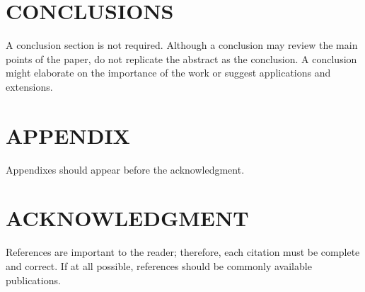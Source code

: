 \documentclass[a4paper, 10pt, conference]{ieeeconf}      %
\begin{document}
\section{CONCLUSIONS}

A conclusion section is not required. Although a conclusion may review the main points of the paper, do not replicate the abstract as the conclusion. A conclusion might elaborate on the importance of the work or suggest applications and extensions. 

\addtolength{\textheight}{-12cm}   %







\section*{APPENDIX}

Appendixes should appear before the acknowledgment.

\section*{ACKNOWLEDGMENT}





References are important to the reader; therefore, each citation must be complete and correct. If at all possible, references should be commonly available publications.
\end{document}
